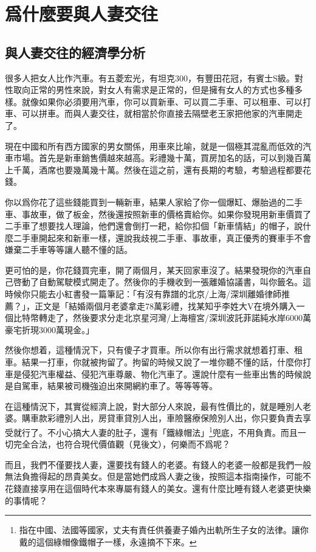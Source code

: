 \chapter{爲什麼要與人妻交往}

\section{與人妻交往的經濟學分析}

很多人把女人比作汽車。有五菱宏光，有坦克300，有豐田花冠，有賓士S級。對性取向正常的男性來說，對女人有需求是正常的，但是擁有女人的方式也多種多樣。就像如果你必須要用汽車，你可以買新車、可以買二手車、可以租車、可以打車、可以拼車。而與人妻交往，就相當於你直接去隔壁老王家把他家的汽車開走了。

現在中國和所有西方國家的男女關係，用車來比喻，就是一個極其混亂而低效的汽車市場。首先是新車銷售價越來越高。彩禮幾十萬，買房加名的話，可以到幾百萬上千萬，酒席也要幾萬幾十萬。然後在這之前，還有長期的考驗，考驗過程都要花錢。

你以爲你花了這些錢能買到一輛新車，結果人家給了你一個爆缸、爆胎過的二手車、事故車，做了板金，然後還按照新車的價格賣給你。如果你發現用新車價買了二手車了想要找人理論，他們還會倒打一耙，給你扣個「新車情結」的帽子，說什麼二手車開起來和新車一樣，還說我歧視二手車、事故車，真正優秀的賽車手不會嫌棄二手車等等讓人聽不懂的話。

更可怕的是，你花錢買完車，開了兩個月，某天回家車沒了。結果發現你的汽車自己啓動了自動駕駛模式開走了。然後你的手機收到一張離婚協議書，叫你籤名。這時候你只能去小紅書發一篇筆記：「有沒有靠譜的北京/上海/深圳離婚律師推薦？」，正文是「結婚兩個月老婆拿走78萬彩禮，找某知乎李姓大V在境外購入一個比特幣轉走了，然後要求分走北京星河灣/上海檀宮/深圳波託菲諾純水岸6000萬豪宅折現3000萬現金。」

然後你想着，這種情況下，只有傻子才買車。所以你有出行需求就想着打車、租車。結果一打車，你就被拘留了。拘留的時候又說了一堆你聽不懂的話，什麼你打車是侵犯汽車權益、侵犯汽車尊嚴、物化汽車了。還說什麼有一些車出售的時候說是自駕車，結果被司機強迫出來開網約車了。等等等等。

在這種情況下，其實從經濟上說，對大部分人來說，最有性價比的，就是睡別人老婆。購車款彩禮別人出，房貸車貸別人出，車險醫療保險別人出，你只要負責去享受就行了。不小心搞大人妻的肚子，還有「鐵綠帽法」\footnote{指在中國、法國等國家，丈夫有責任供養妻子婚內出軌所生子女的法律。讓你戴的這個綠帽像鐵帽子一樣，永遠摘不下來。}兜底，不用負責。而且一切完全合法，也符合現代價值觀（見後文），何樂而不爲呢？

而且，我們不僅要找人妻，還要找有錢人的老婆。有錢人的老婆一般都是我們一般無法負擔得起的昂貴美女。但是當她們成爲人妻之後，按照這本指南操作，可能不花錢直接享用在這個時代本來專屬有錢人的美女。還有什麼比睡有錢人老婆更快樂的事情呢？

